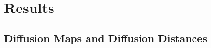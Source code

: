 \documentclass[11pt]{article}
\theoremstyle{definition}
\begin{document}

	\vspace*{-0.2cm}
\section{Results}
\label{sec:method}
	\vspace*{-0.2cm}
\subsection{Diffusion Maps and Diffusion Distances}
\label{ssec:method2}
\end{document}
